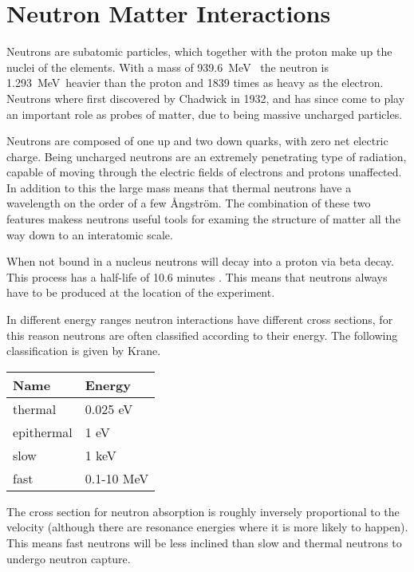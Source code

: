 \documentclass[main.tex]{subfiles}
\begin{document}
\section{Neutron Matter Interactions}
Neutrons are subatomic particles, which together with the proton make up the nuclei of the elements. With a mass of \SI{939.6}{\MeV\;} the neutron is \SI{1.293}{\MeV\;}heavier than the proton and 1839 times as heavy as the electron. Neutrons where first discovered by Chadwick in 1932, and has since come to play an important role as probes of matter, due to being massive uncharged particles.

Neutrons are composed of one up and two down quarks, with zero net electric charge. Being uncharged neutrons are an extremely penetrating type of radiation, capable of moving through the electric fields of electrons and protons unaffected. In addition to this the large mass means that thermal neutrons have a wavelength on the order of a few Ångström. The combination of these two features makess neutrons useful tools for examing the structure of matter all the way down to an interatomic scale.

When not bound in a nucleus neutrons will decay into a proton via beta decay. This process has a half-life of 10.6 minutes \cite[pg.444]{Krane}. This means that neutrons always have to be produced at the location of the experiment.

In different energy ranges neutron interactions have different cross sections, for this reason neutrons are often classified according to their energy. The following classification is given by Krane\cite[444]{Krane}.

\begin{table}[h]
\center
\begin{tabular}{|l|l|}
\hline
\textbf{Name} & \textbf{Energy} \\ \hline
thermal       & 0.025 eV        \\ \hline
epithermal    & 1 eV            \\ \hline
slow          & 1 keV           \\ \hline
fast          & 0.1-10 MeV      \\ \hline
\end{tabular}
\label{tab:neutron}
\end{table}

The cross section for neutron absorption is roughly inversely proportional to the velocity (although there are resonance energies where it is more likely to happen). This means fast neutrons will be less inclined than slow and thermal neutrons to undergo neutron capture. 
\end{document}
